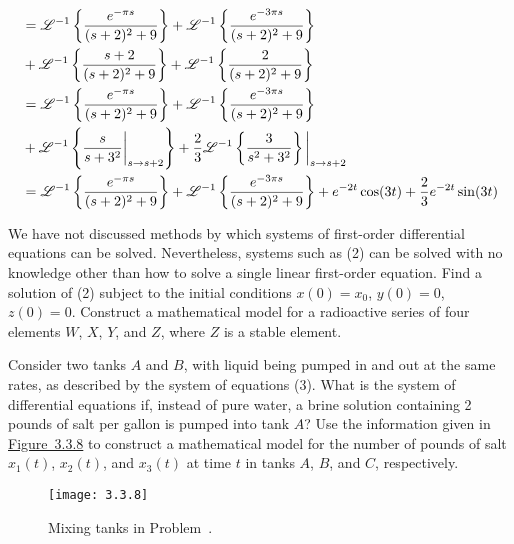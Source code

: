 \documentclass[chapter=7,section=5]{math252homework}
\begin{document}
\begin{problems}[start=3]
{\begin{equation*}
\begin{aligned}
		  &= \laplacei[\frac{e^{-\pi s}}{(s+2)^{2} + 9}] + \laplacei[\frac{e^{-3\pi s}}{(s+2)^{2} + 9}]
		   \\&+ \laplacei[\frac{s + 2}{(s+2)^{2} + 9}] + \laplacei[\frac{2}{(s+2)^{2} + 9}]\\
		  &= \laplacei[\frac{e^{-\pi s}}{(s+2)^{2} + 9}] + \laplacei[\frac{e^{-3\pi s}}{(s+2)^{2} + 9}]
		   \\&+ \laplacei[\frac{s}{s + 3^{2}}\bigg|_{s\rightarrow s+2}] + \frac{2}{3}\laplacei[\frac{3}{s^{2} + 3^{2}}]\bigg|_{s\rightarrow s+2}\\
		  &= \laplacei[\frac{e^{-\pi s}}{(s+2)^{2} + 9}] + \laplacei[\frac{e^{-3\pi s}}{(s+2)^{2} + 9}] + e^{-2t}\cos(3t) + \frac{2}{3}e^{-2t}\sin(3t)\\
	\end{aligned}
	\end{equation*}}
\end{problems}

\setcounter{chapter}{3}
\setcounter{section}{3}

\begin{problems}
	\problem We have not discussed methods by which systems of first-order differential equations can be solved.
	Nevertheless, systems such as (2) can be solved with no knowledge other than how to solve a single linear first-order equation.
	Find a solution of (2) subject to the initial conditions $x(0)=x_{0}$, $y(0)=0$, $z(0)=0$.
	\setcounter{problemsi}{3}
	\problem Construct a mathematical model for a radioactive series of four elements $W$, $X$, $Y$, and $Z$, where $Z$ is a stable element.
\end{problems}

\begin{problems}[start=7]
	\problem Consider two tanks $A$ and $B$, with liquid being pumped in and out at the same rates, as described by the system of equations (3).
	What is the system of differential equations if, instead of pure water, a brine solution containing 2 pounds of salt per gallon is pumped into tank $A$?
	\problem Use the information given in \hyperref[fig:3.3.8]{Figure~3.3.8} to construct a mathematical model for the number of pounds of salt $x_{1}(t)$, $x_{2}(t)$, and $x_{3}(t)$ at time $t$ in tanks $A$, $B$, and $C$, respectively.
	\begin{figure}[H]
		\centering
		\texttt{[image: 3.3.8]}
		\caption{Mixing tanks in Problem~\hyperref[prb:]{\arabic{problemsi}}.}
		\label{fig:3.3.8}
	\end{figure}
\end{problems}
\end{document}
